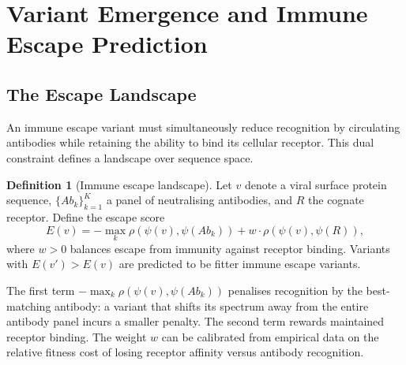\documentclass[twocolumn,11pt,a4paper]{article}
\theoremstyle{definition}
\newtheorem{definition}[theorem]{Definition}
\theoremstyle{remark}
\begin{document}
\section{Variant Emergence and Immune Escape Prediction}
\label{sec:escape}

\subsection{The Escape Landscape}

An immune escape variant must simultaneously reduce recognition by circulating
antibodies while retaining the ability to bind its cellular receptor. This dual
constraint defines a landscape over sequence space.

\begin{definition}[Immune escape landscape]
\label{def:escape}
Let $v$ denote a viral surface protein sequence, $\{Ab_k\}_{k=1}^K$ a panel of
neutralising antibodies, and $R$ the cognate receptor. Define the escape score
\begin{equation}
  E(v) = -\max_k \rho\!\left(\psi(v), \psi(Ab_k)\right)
         + w \cdot \rho\!\left(\psi(v), \psi(R)\right),
  \label{eq:escape_landscape}
\end{equation}
where $w > 0$ balances escape from immunity against receptor binding. Variants
with $E(v') > E(v)$ are predicted to be fitter immune escape variants.
\end{definition}

The first term $-\max_k \rho(\psi(v), \psi(Ab_k))$ penalises recognition by
the best-matching antibody: a variant that shifts its spectrum away from the
entire antibody panel incurs a smaller penalty. The second term rewards
maintained receptor binding. The weight $w$ can be calibrated from empirical
data on the relative fitness cost of losing receptor affinity versus antibody
recognition.
\end{document}
